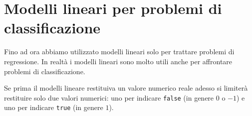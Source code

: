 \chapter{Modelli lineari per problemi di classificazione}
Fino ad ora abbiamo utilizzato modelli lineari solo per trattare problemi di regressione. In realt\`a i modelli lineari
sono molto utili anche per affrontare problemi di classificazione.

Se prima il modelli lineare restituiva un valore numerico reale adesso si limiter\`a restituire solo due valori numerici:
uno per indicare \verb|false| (in genere $0$ o $-1$) e uno per indicare \verb|true| (in genere $1$).
